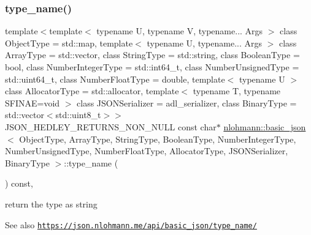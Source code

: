 \subsubsection{\texorpdfstring{type\+\_\+name()}{type\_name()}}
{\footnotesize\ttfamily template$<$template$<$ typename U, typename V, typename... Args $>$ class Object\+Type = std\+::map, template$<$ typename U, typename... Args $>$ class Array\+Type = std\+::vector, class String\+Type  = std\+::string, class Boolean\+Type  = bool, class Number\+Integer\+Type  = std\+::int64\+\_\+t, class Number\+Unsigned\+Type  = std\+::uint64\+\_\+t, class Number\+Float\+Type  = double, template$<$ typename U $>$ class Allocator\+Type = std\+::allocator, template$<$ typename T, typename S\+F\+I\+N\+A\+E=void $>$ class J\+S\+O\+N\+Serializer = adl\+\_\+serializer, class Binary\+Type  = std\+::vector$<$std\+::uint8\+\_\+t$>$$>$ \\
J\+S\+O\+N\+\_\+\+H\+E\+D\+L\+E\+Y\+\_\+\+R\+E\+T\+U\+R\+N\+S\+\_\+\+N\+O\+N\+\_\+\+N\+U\+LL const char$\ast$ \hyperlink{classnlohmann_1_1basic__json}{nlohmann\+::basic\+\_\+json}$<$ Object\+Type, Array\+Type, String\+Type, Boolean\+Type, Number\+Integer\+Type, Number\+Unsigned\+Type, Number\+Float\+Type, Allocator\+Type, J\+S\+O\+N\+Serializer, Binary\+Type $>$\+::type\+\_\+name (\begin{DoxyParamCaption}{ }\end{DoxyParamCaption}) const\hspace{0.3cm}{\ttfamily [inline]}, {\ttfamily [noexcept]}}



return the type as string 

\begin{DoxySeeAlso}{See also}
\href{https://json.nlohmann.me/api/basic_json/type_name/}{\tt https\+://json.\+nlohmann.\+me/api/basic\+\_\+json/type\+\_\+name/} 
\end{DoxySeeAlso}
\mbox{\label{classnlohmann_1_1basic__json_adea158bff8642202420898f6322da479}} 
